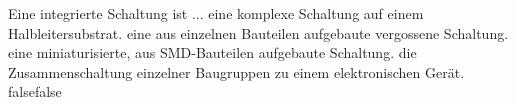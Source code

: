     {Eine integrierte Schaltung ist ...}
    {eine komplexe Schaltung auf einem Halbleitersubstrat.}
    {eine aus einzelnen Bauteilen aufgebaute vergossene Schaltung.}
    {eine miniaturisierte, aus SMD-Bauteilen aufgebaute Schaltung.}
    {die Zusammenschaltung einzelner Baugruppen zu einem elektronischen Gerät.}
    {false}{false}